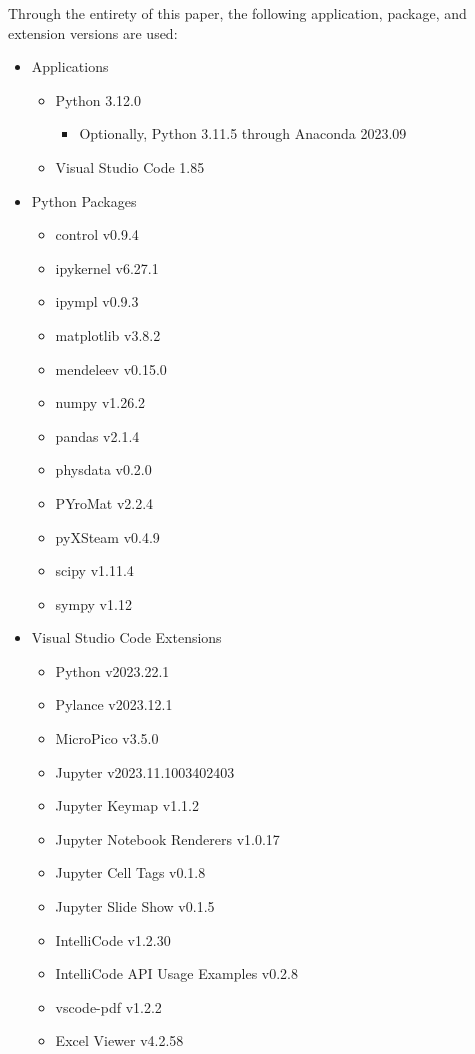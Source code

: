 Through the entirety of this paper, the following application, package, and extension versions are used:

\begin{itemize}
    \item Applications
    \begin{itemize}
        \item Python 3.12.0
            \begin{itemize}
                \item Optionally, Python 3.11.5 through Anaconda 2023.09
            \end{itemize}
        \item Visual Studio Code 1.85
    \end{itemize}
    \item Python Packages
    \begin{itemize}
        \item control v0.9.4
        \item ipykernel v6.27.1
        \item ipympl v0.9.3
        \item matplotlib v3.8.2
        \item mendeleev v0.15.0
        \item numpy v1.26.2
        \item pandas v2.1.4
        \item physdata v0.2.0
        \item PYroMat v2.2.4
        \item pyXSteam v0.4.9
        \item scipy v1.11.4
        \item sympy v1.12
    \end{itemize}
    \item Visual Studio Code Extensions
    \begin{itemize}
        \item Python v2023.22.1
        \item Pylance v2023.12.1
        \item MicroPico v3.5.0
        \item Jupyter v2023.11.1003402403
        \item Jupyter Keymap v1.1.2
        \item Jupyter Notebook Renderers v1.0.17 
        \item Jupyter Cell Tags v0.1.8
        \item Jupyter Slide Show v0.1.5
        \item IntelliCode v1.2.30
        \item IntelliCode API Usage Examples v0.2.8
        \item vscode-pdf v1.2.2
        \item Excel Viewer v4.2.58
    \end{itemize}
\end{itemize}